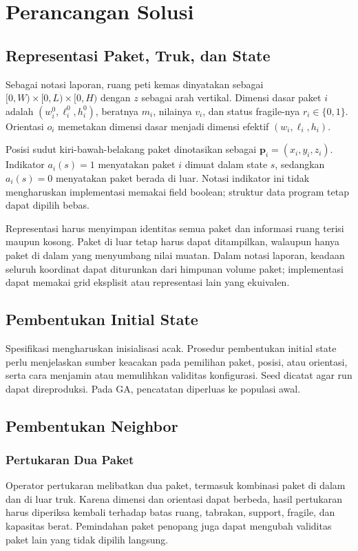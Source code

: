 \section{Perancangan Solusi}
\subsection{Representasi Paket, Truk, dan State}
Sebagai notasi laporan, ruang peti kemas dinyatakan sebagai
$[0,W)\times[0,L)\times[0,H)$ dengan $z$ sebagai arah vertikal. Dimensi dasar
paket $i$ adalah $(w_i^0,\ell_i^0,h_i^0)$, beratnya $m_i$, nilainya $v_i$,
dan status fragile-nya $r_i\in\{0,1\}$. Orientasi $o_i$ memetakan dimensi dasar
menjadi dimensi efektif $(w_i,\ell_i,h_i)$.

Posisi sudut kiri-bawah-belakang paket dinotasikan sebagai
$\boldsymbol{p}_i=(x_i,y_i,z_i)$. Indikator $a_i(s)=1$ menyatakan paket $i$
dimuat dalam state $s$, sedangkan $a_i(s)=0$ menyatakan paket berada di luar.
Notasi indikator ini tidak mengharuskan implementasi memakai field boolean;
struktur data program tetap dapat dipilih bebas.

Representasi harus menyimpan identitas semua paket dan informasi ruang terisi
maupun kosong. Paket di luar tetap harus dapat ditampilkan, walaupun hanya
paket di dalam yang menyumbang nilai muatan. Dalam notasi laporan, keadaan
seluruh koordinat dapat diturunkan dari himpunan volume paket; implementasi
dapat memakai grid eksplisit atau representasi lain yang ekuivalen.


\subsection{Pembentukan Initial State}
Spesifikasi mengharuskan inisialisasi acak. Prosedur pembentukan initial state
perlu menjelaskan sumber keacakan pada pemilihan paket, posisi, atau orientasi,
serta cara menjamin atau memulihkan validitas konfigurasi. Seed dicatat agar
run dapat direproduksi. Pada GA, pencatatan diperluas ke populasi awal.


\subsection{Pembentukan Neighbor}
\subsubsection{Pertukaran Dua Paket}
Operator pertukaran melibatkan dua paket, termasuk kombinasi paket di dalam
dan di luar truk. Karena dimensi dan orientasi dapat berbeda, hasil pertukaran
harus diperiksa kembali terhadap batas ruang, tabrakan, support, fragile,
dan kapasitas berat. Pemindahan paket penopang juga dapat mengubah validitas
paket lain yang tidak dipilih langsung.

